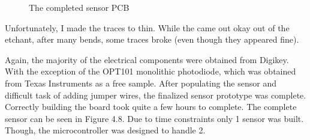 \begin{figure}[htp]
\centering
{}
\caption[Sensor prototype PCB]{The completed sensor PCB}
\end{figure}

Unfortunately, I made the traces to thin. While the came out okay out of the etchant, after many bends, some traces broke (even though they appeared fine). 

Again, the majority of the electrical components were obtained from Digikey. With the exception of the OPT101 monolithic photodiode, which was obtained from Texas Instruments as a free sample. After populating the sensor and difficult task of adding jumper wires, the finalized sensor prototype was complete. Correctly building the board took quite a few hours to complete. The complete sensor can be seen in Figure 4.8. Due to time constraints only 1 sensor was built. Though, the microcontroller was designed to handle 2.

